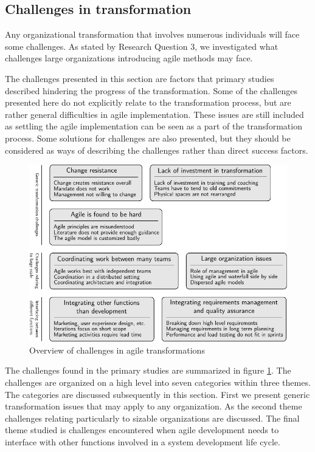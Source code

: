 \clearpage

\subsection{Challenges in transformation}

Any organizational transformation that involves numerous individuals will face
some challenges. As stated by Research Question 3, we investigated what
challenges large organizations introducing agile methods may face.

The challenges presented in this section are factors that primary studies
described hindering the progress of the transformation. Some of the challenges
presented here do not explicitly relate to the transformation process, but are
rather general difficulties in agile implementation. These issues are still
included as settling the agile implementation can be seen as a part of the
transformation process. Some solutions for challenges are also presented, but
they should be considered as ways of describing the challenges rather than
direct success factors.

\begin{figure}[!b]
  \begin{center}
    \includegraphics{graphics/challenges_summary.pdf}
    \caption{Overview of challenges in agile transformations}
    \label{fig:challenges_summary}
  \end{center}
\end{figure}

The challenges found in the primary studies are summarized in figure
\ref{fig:challenges_summary}. The challenges are organized on a high level into
seven categories within three themes. The categories are discussed subsequently
in this section. First we present generic transformation issues that may apply
to any organization. As the second theme challenges relating particularly to
sizable organizations are discussed. The final theme studied is challenges
encountered when agile development needs to interface with other functions
involved in a system development life cycle.

